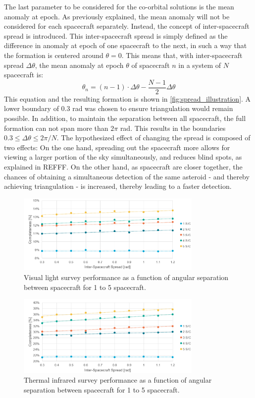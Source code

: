The last parameter to be considered for the co-orbital solutions is the mean anomaly at epoch. As previously explained, the mean anomaly will not be considered for each spacecraft separately. Instead, the concept of inter-spacecraft spread is introduced. This inter-spacecraft spread is simply defined as the difference in anomaly at epoch of one spacecraft to the next, in such a way that the formation is centered around $\theta=0$. This means that, with inter-spacecraft spread $\Delta \theta$, the mean anomaly at epoch $\theta$ of spacecraft $n$ in a system of $N$ spacecraft is:
\begin{equation}
 \theta_n = (n-1) \cdot \Delta \theta - \frac{N-1}{2}\Delta \theta
\end{equation}
This equation and the resulting formation is shown in \autoref{fig:spread_illustration}. A lower boundary of 0.3 rad was chosen to ensure triangulation would remain possible. In addition, to maintain the separation between all spacecraft, the full formation can not span more than $2\pi$ rad. This results in the boundaries $0.3 \leq \Delta \theta \leq 2\pi/N$. The hypothesized effect of changing the spread is composed of two effects: On the one hand, spreading out the spacecraft more allows for viewing a larger portion of the sky simultaneously, and reduces blind spots, as explained in REFFF. On the other hand, as spacecraft are closer together, the chances of obtaining a simultaneous detection of the same asteroid - and thereby achieving triangulation - is increased, thereby leading to a faster detection.\\

\begin{figure}[htbp]
 \centering
 \includegraphics[width=0.8\textwidth]{img/vis_spread.png}
 \caption{Visual light survey performance as a function of angular separation between spacecraft for 1 to 5 spacecraft.}
 \label{fig:vis_spread}
\end{figure}

\begin{figure}[htbp]
 \centering
 \includegraphics[width=0.8\textwidth]{img/tir_spread.png}
 \caption{Thermal infrared survey performance as a function of angular separation between spacecraft for 1 to 5 spacecraft.}
 \label{fig:tir_spread}
\end{figure}

